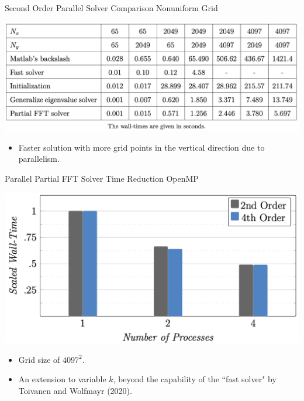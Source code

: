 \documentclass[handout]{beamer}
\begin{document}
\begin{frame}{Second Order Parallel Solver Comparison Nonuniform Grid}
\begin{center}
\includegraphics[scale=.395]{images/tv_nonuni}
\begin{itemize}
\item Faster solution with more grid points in the vertical direction due to parallelism.
\end{itemize}
\end{center}
\end{frame}




\begin{frame}{Parallel Partial FFT Solver Time Reduction OpenMP}
\begin{center}
\includegraphics[scale=.45]{images/kz}\\
\begin{itemize}
\item Grid size of $4097^2$.
\item An extension to variable $k$, beyond the capability of the ``fast solver" by Toivanen and Wolfmayr (2020). 
\end{itemize}
\end{center}
\end{frame}
\end{document}
